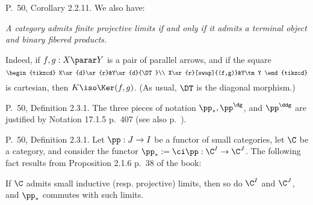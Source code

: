 \documentclass[12pt]{article}
\theoremstyle{remark}
\theoremstyle{definition}
\begin{document}
%

\begin{s}
P.~50, Corollary 2.2.11. We also have:

\emph{A category admits finite projective limits if and only if it admits a terminal object and binary fibered products.}

Indeed, if $f,g:X\parar Y$ is a pair of parallel arrows, and if the square 
$$
\begin{tikzcd}
K\ar{d}\ar{r}&Y\ar{d}{\DT}\\ 
X\ar{r}[swap]{(f,g)}&Y\tm Y
\end{tikzcd}
$$
is cartesian, then $K\iso\Ker(f,g)$. (As usual, $\DT$ is the diagonal morphism.)
\end{s}

%

\begin{s}
P.~50, Definition 2.3.1. The three pieces of notation $\pp_*,\pp^\dg$, and $\pp^\ddg$ are justified by Notation 17.1.5 p.~407 (see also  p.~). 
\end{s} 

% 

\begin{s}
P.~50, Definition 2.3.1. Let $\pp:J\to I$ be a functor of small categories, let $\C$ be a category, and consider the functor $\pp_*:=\ci\pp:\C^I\to\C^J$. The following fact results from Proposition 2.1.6 p.~38 of the book: 

If $\C$ admits small inductive (resp. projective) limits, then so do $\C^I$ and $\C^J$, and $\pp_*$ commutes with such limits. 
\end{s} 

%
\end{document}
